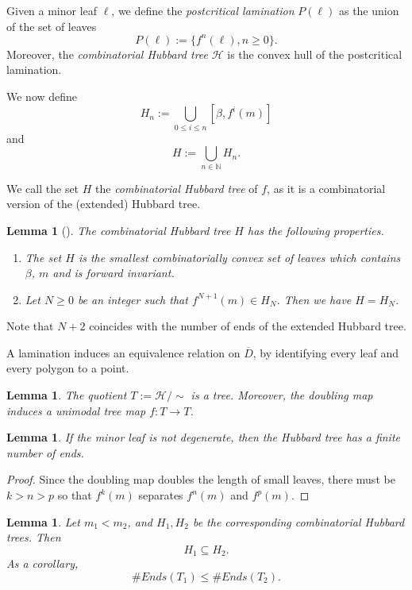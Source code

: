 \documentclass[11pt]{amsart}
\newtheorem{lemma}[theorem]{Lemma}
\begin{document}
Given a minor leaf $\ell$, we define the \emph{postcritical lamination} $P(\ell)$ as the union of the 
set of leaves 
$$P(\ell) := \{ f^n(\ell), n \geq 0 \}.$$
Moreover, the \emph{combinatorial Hubbard tree}  $\mathcal{H}$ is the convex hull of the postcritical lamination. 


We now define 
$$H_n := \bigcup_{0 \leq i \leq n} [\beta, f^i(m)]$$
and
$$H := \bigcup_{n \in \mathbb{N}} H_n.$$

We call the set $H$ the \emph{combinatorial Hubbard tree} of $f$, as it is a combinatorial version of the (extended) Hubbard tree.

\begin{lemma}[\cite{ET}] \label{L:invariant}
The combinatorial Hubbard tree $H$ has the following properties.
\begin{enumerate}
\item The set $H$ is the smallest combinatorially convex set of leaves which contains $\beta$, $m$ and is forward invariant.
\item 
Let $N \geq 0$ be an integer such that $f^{N+1}(m) \in H_N$. Then we have 
$H = H_{N}$.
\end{enumerate}
\end{lemma}

Note that $N + 2$ coincides with the number of ends of the extended Hubbard tree.

A lamination induces an equivalence relation on $\overline{D}$, by identifying every leaf and every polygon to a point. 

\begin{lemma}
The quotient $T := \mathcal{H}/\sim$ is a tree. Moreover, the doubling map induces 
a unimodal tree map $f : T \to T$.
\end{lemma}

\begin{lemma}
If the minor leaf is not degenerate, then the Hubbard tree has a finite number of ends. 
\end{lemma}

\begin{proof}
Since the doubling map doubles the length of small leaves, there must be $k > n > p$ so that 
$f^k(m)$ separates $f^n(m)$ and $f^p(m)$. 
\end{proof}



\begin{lemma}
Let $m_1 < m_2$, and $H_1, H_2$ be the corresponding combinatorial Hubbard trees. Then 
$$H_1 \subseteq H_2.$$
As a corollary, 
$$\#Ends(T_1) \leq \#Ends(T_2).$$
\end{lemma}
\end{document}
